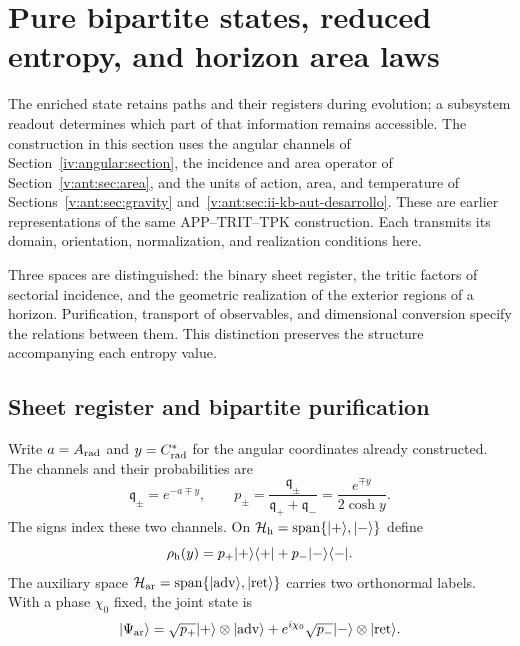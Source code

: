 
\section{Pure bipartite states, reduced entropy, and horizon area laws}
\label{vii:sec:horizontes-informacion}

The enriched state retains paths and their registers during
evolution; a subsystem readout determines which part of that information
remains accessible. The construction in this section uses the angular
channels of Section~\ref{iv:angular:section}, the incidence and
area operator of Section~\ref{v:ant:sec:area}, and the units
of action, area, and temperature of
Sections~\ref{v:ant:sec:gravity}
and~\ref{v:ant:sec:ii-kb-aut-desarrollo}. These are earlier representations of the
same APP--TRIT--TPK construction. Each transmits its domain,
orientation, normalization, and realization conditions here.

Three spaces are distinguished: the binary sheet register, the
tritic factors of sectorial incidence, and the geometric realization of the
exterior regions of a horizon. Purification, transport of observables,
and dimensional conversion specify the relations between them. This
distinction preserves the structure accompanying each entropy value.

\subsection{Sheet register and bipartite purification}
\label{vii:subsec:hojas-purificacion}

Write \(a=A_{\rm rad}\) and \(y=C^*_{\rm rad}\) for the
angular coordinates already constructed. The channels and their probabilities are
\begin{equation}
 \mathfrak q_\pm=e^{-a\mp y},\qquad
 p_\pm=\frac{\mathfrak q_\pm}{\mathfrak q_++\mathfrak q_-}
       =\frac{e^{\mp y}}{2\cosh y}.
 \label{vii:eq:probabilidades-hoja}
\end{equation}
The signs index these two channels. On
\(\mathcal H_{\rm h}=\operatorname{span}\{|+\rangle,|-\rangle\}\)
define
\[
 \rho_{\rm h}(y)=p_+|+\rangle\langle+|+p_-|-\rangle\langle-|.
\]
The auxiliary space
\(\mathcal H_{\rm ar}=\operatorname{span}
\{|\mathrm{adv}\rangle,|\mathrm{ret}\rangle\}\)
carries two orthonormal labels. With a phase \(\chi_0\) fixed, the joint
state is
\begin{equation}
 |\Psi_{\rm ar}\rangle
 =\sqrt{p_+}|+\rangle\otimes|\mathrm{adv}\rangle
  +e^{i\chi_0}\sqrt{p_-}|-\rangle\otimes|\mathrm{ret}\rangle.
 \label{vii:eq:purificacion-hoja}
\end{equation}


